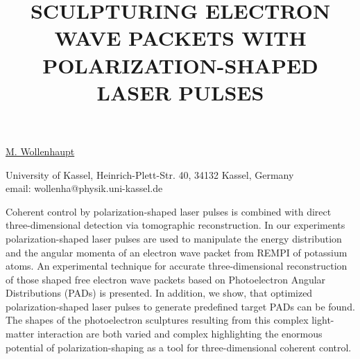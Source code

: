 \title{SCULPTURING ELECTRON WAVE PACKETS WITH POLARIZATION-SHAPED LASER PULSES}

\underline{M. Wollenhaupt}


University of Kassel,
Heinrich-Plett-Str. 40,
34132 Kassel,
Germany\\
email: wollenha@physik.uni-kassel.de

Coherent control by polarization-shaped laser pulses is combined with direct three-dimensional detection via tomographic reconstruction.  In our experiments polarization-shaped laser pulses are used to manipulate the energy distribution and the angular momenta of an electron wave packet from REMPI of potassium atoms.  An experimental technique for accurate three-dimensional reconstruction of those shaped free electron wave packets based on Photoelectron Angular Distributions (PADs) is presented.  In addition, we show, that optimized polarization-shaped laser pulses to generate predefined target PADs can be found. The shapes of the photoelectron sculptures resulting from this complex light-matter interaction are both varied and complex highlighting the enormous potential of polarization-shaping as a tool for three-dimensional coherent control.

\vspace{\baselineskip}